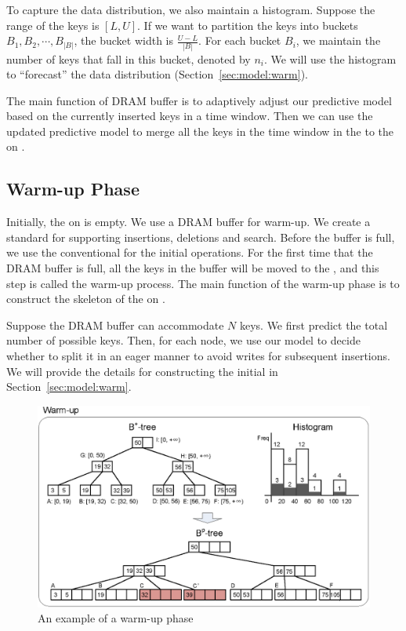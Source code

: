 To capture the data distribution,
we also maintain a histogram.
Suppose the range of the keys is $[L, U]$.
If we want to partition the keys into buckets $B_1, B_2, \cdots, B_{|B|}$,
the bucket width is $\frac{U-L}{|B|}$.
For each bucket $B_i$, we maintain the number of keys that fall in this bucket, denoted by $n_i$.
We will use the histogram to ``forecast'' the data distribution (Section~\ref{sec:model:warm}).

The main function of DRAM buffer is to adaptively adjust our predictive model based on the currently inserted keys in a time window. Then we can use the updated predictive model to merge all the keys in the time window in the \bplustree to the \bptree on \pcm.




\subsection{Warm-up Phase} \label{sec:warmup}

Initially, the \bptree on \pcm is empty.
We use a DRAM buffer for warm-up.
We create a standard \bplustree for supporting insertions,
deletions and search.
Before the buffer is full, we use the conventional \bplustree for the initial operations.
For the first time that the DRAM buffer is full,
all the keys in the buffer will be moved to the \pcm,
and this step is called the warm-up process.
The main function of the warm-up phase is to
construct the skeleton of the \bptree on \pcm.

Suppose the DRAM buffer can accommodate $N$ keys.
We first predict the total number of possible keys.
Then, for each \bplustree node,
we use our \predict model to decide whether to split it
in an eager manner to avoid writes for subsequent insertions.
We will provide the details for constructing the initial \bptree
in Section~\ref{sec:model:warm}.


\begin{figure}[!t]
\centering
\includegraphics[scale=0.85]{figs/warmup.eps}
\caption{An example of a warm-up phase}
\label{fig:ex:warmup}
\end{figure}


